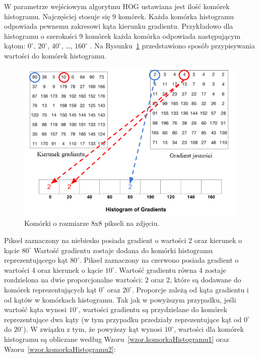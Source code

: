 \documentclass[a4paper,twoside,12pt]{book}
\begin{document}
    W parametrze wejściowym algorytmu HOG ustawiana jest ilość komórek histogramu.
    Najczęściej stosuje się 9 komórek. Każda komórka histogramu odpowiada pewnemu zakresowi kąta kierunku gradientu.
    Przykładowo dla histogramu o szerokości 9 komórek każda komórka odpowiada następującym kątom:
    $0^{\circ}$, $20^{\circ}$, $40^{\circ}$, \ldots, $160^{\circ}$ .
    Na Rysunku~\ref{fig.hogTworzenieHistogramu} przedstawiono sposób przypisywania wartości do komórek histogramu.
    \begin{figure}
        \centering
        \includegraphics[width=11cm]{Obrazy/hogTworzenieHistogramu.jpg}
        \caption{Komórki o rozmiarze 8x8 pikseli na zdjęciu.~\cite{hogOpenCv}}
        \label{fig.hogTworzenieHistogramu}
    \end{figure}
    Piksel zaznaczony na niebiesko posiada gradient o wartości 2 oraz kierunek o kącie $80^{\circ}$
    Wartość gradientu zostaje dodana do komórki histogramu reprezentującego kąt $80^{\circ}$.
    Piksel zaznaczony na czerwono posiada gradient o wartości 4 oraz kierunek o kącie $10^{\circ}$.
    Wartość gradientu równa 4 zostaje rozdzielona na dwie proporcjonalne wartości: 2 oraz 2, które są dodawane do
    komórek reprezentujących kąt $0^{\circ}$ oraz $20^{\circ}$.
    Proporcje zależą od kąta gradientu i od kątów w komórkach histogramu.
    Tak jak w powyższym przypadku, jeśli wartość kąta wynosi $10^{\circ}$, wartości gradientu są przydzielane do
    komórek reprezentujące dwa kąty (w tym przypadku przedziały reprezentujące kąt od $0^{\circ}$ do
    $20^{\circ}$). W związku z tym, że powyższy kąt wynosi $10^{\circ}$, wartości dla komórek histogramu są obliczane
    według Wzoru~\ref{wzor.komorkaHistogramu1} oraz Wzoru~\ref{wzor.komorkaHistogramu2}:
\end{document}
